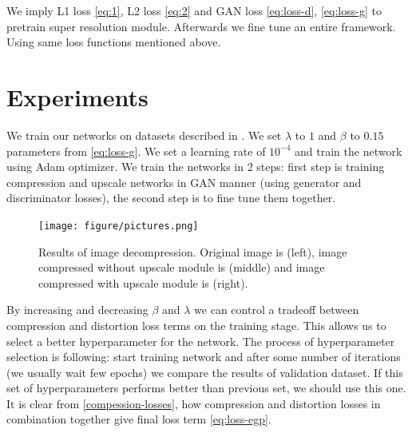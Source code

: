 We imply L1 loss \ref{eq:1}, L2 loss \ref{eq:2} and GAN loss \ref{eq:loss-d}, \ref{eq:loss-g} to pretrain super resolution module. Afterwards we fine tune an entire framework. Using same loss functions mentioned above.

\chapter{Experiments}

We train our networks on datasets described in . We set $\lambda$ to $1$ and $\beta$ to $0.15$ parameters from \ref{eq:loss-g}. We set a learning rate of $10^{-4}$ and train the network using Adam optimizer. We train the networks in 2 steps: first step is training compression and upscale networks in GAN manner (using generator and discriminator losses), the second step is to fine tune them together.

\begin{figure}[!ht]
    \centering
    \texttt{[image: figure/pictures.png]}
    \caption{Results of image decompression. Original image is (left), image compressed without upscale module is (middle) and image compressed with upscale module is (right).}
    \label{road}
\end{figure}

By increasing and decreasing $\beta$ and $\lambda$ we can control a tradeoff between compression and distortion loss terms on the training stage. This allows us to select a better hyperparameter for the network. The process of hyperparameter selection is following: start training network and after some number of iterations (we usually wait few epochs) we compare the results of validation dataset. If this set of hyperparameters performs better than previous set, we should use this one. It is clear from \ref{compession-losses}, how compression and distortion losses in combination together give final loss term \ref{eq:loss-egp}.

